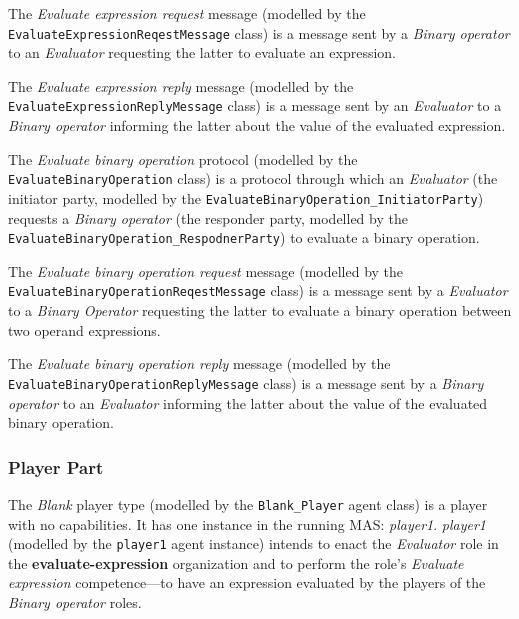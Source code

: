 The \textit{Evaluate expression request} message (modelled by the \texttt{EvaluateExpressionReqestMessage} class) is a message sent by a \textit{Binary operator} to an \textit{Evaluator} requesting the latter to evaluate an expression.

The \textit{Evaluate expression reply} message (modelled by the \texttt{EvaluateExpressionReplyMessage} class) is a message sent by an \textit{Evaluator} to a \textit{Binary operator} informing the latter about the value of the evaluated expression.

The \textit{Evaluate binary operation} protocol (modelled by the \texttt{EvaluateBinaryOperation} class) is a protocol through which an \textit{Evaluator} (the initiator party, modelled by the \texttt{EvaluateBinaryOperation\_InitiatorParty}) requests a \textit{Binary operator} (the responder party, modelled by the \texttt{EvaluateBinaryOperation\_RespodnerParty}) to evaluate a binary operation.

The \textit{Evaluate binary operation request} message (modelled by the \texttt{EvaluateBinaryOperationReqestMessage} class) is a message sent by a \textit{Evaluator} to a \textit{Binary Operator} requesting the latter to evaluate a binary operation between two operand expressions.

The \textit{Evaluate binary operation reply} message (modelled by the \texttt{EvaluateBinaryOperationReplyMessage} class) is a message sent by a \textit{Binary operator} to an \textit{Evaluator} informing the latter about the value of the evaluated binary operation.

\subsubsection*{Player Part}

The \textit{Blank} player type (modelled by the \texttt{Blank\_Player} agent class) is a player with no capabilities.
It has one instance in the running MAS: \textit{player1}.
\textit{player1} (modelled by the \texttt{player1} agent instance) intends to enact the \textit{Evaluator} role in the \textbf{evaluate-expression} organization and to perform the role's \textit{Evaluate expression} competence---to have an expression evaluated by the players of the \textit{Binary operator} roles.

